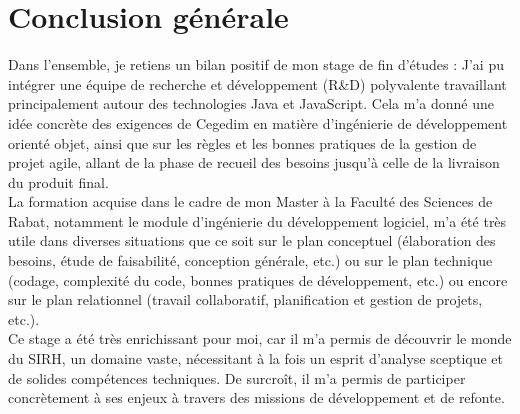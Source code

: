 
{}
\section*{Conclusion générale}

Dans l'ensemble, je retiens un bilan positif de mon stage de fin d'études : J'ai pu intégrer une équipe de recherche et développement (R\&D) polyvalente travaillant principalement autour des technologies Java et JavaScript. Cela m'a donné une idée concrète des exigences de Cegedim en matière d'ingénierie de développement orienté objet,
ainsi que sur les règles et les bonnes pratiques de la gestion de projet agile, allant de la phase de recueil des besoins jusqu'à celle de la livraison du produit final.\\

La formation acquise dans le cadre de mon Master à la Faculté des Sciences de Rabat, notamment le module d'ingénierie du développement logiciel, m'a été très utile dans diverses situations que ce soit sur le plan conceptuel (élaboration des besoins, étude de faisabilité, conception générale, etc.) ou sur le plan technique (codage, complexité du code, bonnes pratiques de développement, etc.) ou encore sur le plan relationnel (travail collaboratif, planification et gestion de projets, etc.).\\
Ce stage a été très enrichissant pour moi, car il m'a permis de découvrir le monde du SIRH, un domaine vaste, nécessitant à la fois un esprit d'analyse sceptique et de solides compétences techniques. De surcroît, il m'a permis de participer concrètement à ses enjeux à travers des missions de développement et de refonte.